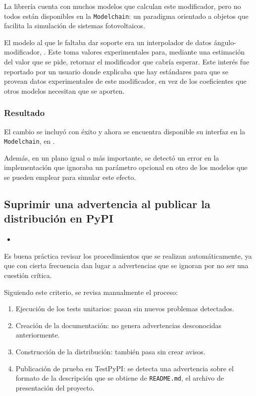 La librería \pvlibpy{} cuenta con muchos modelos que calculan este modificador, pero no todos están disponibles en la \texttt{Modelchain}: un paradigma orientado a objetos que facilita la simulación de sistemas fotovoltaicos.

El modelo al que le faltaba dar soporte era un interpolador de datos ángulo-modificador, . Este toma valores experimentales para, mediante una estimación del valor que se pide, retornar el modificador que cabría esperar. Este interés fue reportado por un usuario donde explicaba que hay estándares para que se provean datos experimentales de este modificador, en vez de los coeficientes que otros modelos necesitan que se aporten.

\subsubsection{Resultado}

El cambio se incluyó con éxito y ahora se encuentra disponible su interfaz en la \texttt{Modelchain}, en .

Además, en un plano igual o más importante, se detectó un error en la implementación que ignoraba un parámetro opcional en otro de los modelos que se pueden emplear para simular este efecto.

\subsection{Suprimir una advertencia al publicar la distribución en PyPI}

\begin{itemize}
    \item {}
\end{itemize}

Es buena práctica revisar los procedimientos que se realizan automáticamente, ya que con cierta frecuencia dan lugar a advertencias que se ignoran por no ser una cuestión crítica.

Siguiendo este criterio, se revisa manualmente el proceso:

\begin{enumerate}
    \item Ejecución de los tests unitarios: pasan sin nuevos problemas detectados.
    \item Creación de la documentación: no genera advertencias desconocidas anteriormente.
    \item Construcción de la distribución: también pasa sin crear avisos.
    \item Publicación de prueba en TestPyPI: se detecta una advertencia sobre el formato de la descripción que se obtiene de \texttt{README.md}, el archivo de presentación del proyecto.
\end{enumerate}

